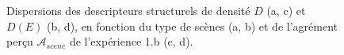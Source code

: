 \begin{figure}[t]
        \myfloatalign
        \par
       \caption{Dispersions des descripteurs structurels de densité $D$ (a, c) et $D(E)$ (b, d), en fonction du type de scènes (a, b) et de l'agrément perçu $\mathcal{A}_{scene}$ de l'expérience 1.b (c, d).}\label{fig:density}
\end{figure}

